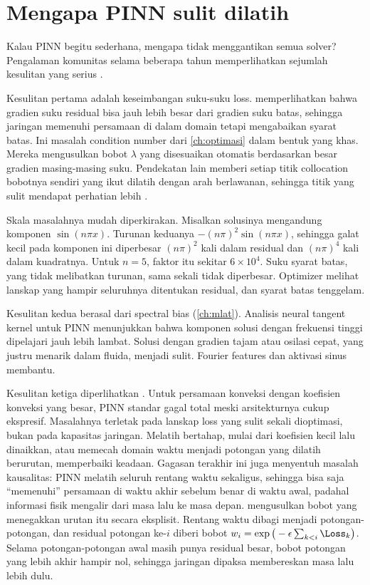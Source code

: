 \section{Mengapa PINN sulit dilatih}

Kalau PINN begitu sederhana, mengapa tidak menggantikan semua solver? Pengalaman komunitas selama
beberapa tahun memperlihatkan sejumlah kesulitan yang serius \citep{cuomo2022}.

Kesulitan pertama adalah keseimbangan suku-suku loss. \citet{wang2021} memperlihatkan bahwa gradien suku
residual bisa jauh lebih besar dari gradien suku batas, sehingga jaringan memenuhi persamaan di dalam
domain tetapi mengabaikan syarat batas. Ini masalah condition number dari \cref{ch:optimasi} dalam bentuk
yang khas. Mereka mengusulkan bobot $\lambda$ yang disesuaikan otomatis berdasarkan besar gradien
masing-masing suku. Pendekatan lain memberi setiap titik collocation bobotnya sendiri yang ikut dilatih
dengan arah berlawanan, sehingga titik yang sulit mendapat perhatian lebih \citep{mcclenny2023}.

Skala masalahnya mudah diperkirakan. Misalkan solusinya mengandung komponen $\sin(n\pi x)$. Turunan
keduanya $-(n\pi)^2\sin(n\pi x)$, sehingga galat kecil pada komponen ini diperbesar $(n\pi)^2$ kali dalam residual
dan $(n\pi)^4$ kali dalam kuadratnya. Untuk $n=5$, faktor itu sekitar $6\times10^4$. Suku syarat batas, yang tidak
melibatkan turunan, sama sekali tidak diperbesar. Optimizer melihat lanskap yang hampir seluruhnya ditentukan
residual, dan syarat batas tenggelam.

Kesulitan kedua berasal dari spectral bias (\cref{ch:mlat}). Analisis neural tangent kernel untuk PINN
\citep{wang2022} menunjukkan bahwa komponen solusi dengan frekuensi tinggi dipelajari jauh lebih lambat.
Solusi dengan gradien tajam atau osilasi cepat, yang justru menarik dalam fluida, menjadi sulit. Fourier
features dan aktivasi sinus membantu.

Kesulitan ketiga diperlihatkan \citet{krishnapriyan2021}. Untuk persamaan konveksi dengan koefisien
konveksi yang besar, PINN standar gagal total meski arsitekturnya cukup ekspresif. Masalahnya terletak
pada lanskap loss yang sulit sekali dioptimasi, bukan pada kapasitas jaringan. Melatih bertahap, mulai
dari koefisien kecil lalu dinaikkan, atau memecah domain waktu menjadi potongan yang dilatih berurutan,
memperbaiki keadaan. Gagasan terakhir ini juga menyentuh masalah kausalitas: PINN melatih seluruh rentang
waktu sekaligus, sehingga bisa saja ``memenuhi'' persamaan di waktu akhir sebelum benar di waktu awal,
padahal informasi fisik mengalir dari masa lalu ke masa depan. \citet{wang2024causal} mengusulkan bobot yang
menegakkan urutan itu secara eksplisit. Rentang waktu dibagi menjadi potongan-potongan, dan residual potongan
ke-$i$ diberi bobot $w_i=\exp\big(-\epsilon\sum_{k<i}\Loss_k\big)$. Selama potongan-potongan awal masih punya
residual besar, bobot potongan yang lebih akhir hampir nol, sehingga jaringan dipaksa membereskan masa lalu
lebih dulu.

